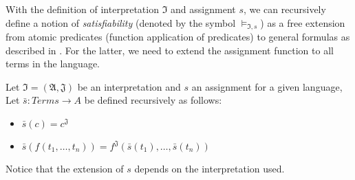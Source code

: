 With the definition of interpretation $\mathfrak{I}$ and assignment $s$, we can recursively define a notion of \emph{satisfiability} (denoted by the symbol $\models_{\mathfrak{I}, s} $) as a free extension from atomic predicates (function application of predicates) to general formulas as described in \cite{DBLP:books/daglib/0076838}. For the latter, we need to extend the assignment function to all terms in the language.

\begin{definition}
  Let $\mathfrak{I} = (\mathfrak{A}, \mathfrak{J})$ be an interpretation and $s$ an assignment for a given language,
  Let $\bar{s} : Terms \rightarrow A$ be defined recursively as follows:
  \begin{itemize}
    \item $\bar{s}(c) = c^\mathfrak{J}$
    \item $\bar{s}(f(t_1, \dots, t_n)) = f^\mathfrak{J}(\bar{s}(t_1), \dots, \bar{s}(t_n))$
  \end{itemize}
\end{definition}

Notice that the extension of $s$ depends on the interpretation used.

